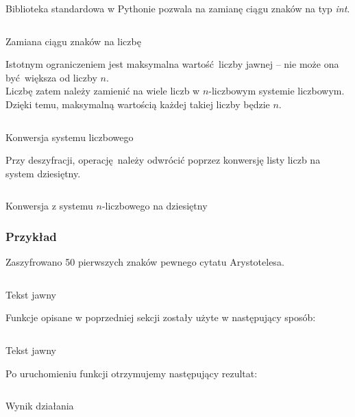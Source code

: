 \documentclass[12pt]{article}
\begin{document}
Biblioteka standardowa w Pythonie 
pozwala na zamianę ciągu znaków na typ \textit{int}.

\begin{listing}[H]
	\inputminted[]{python}{3-bytes-example.py}
	\caption{Zamiana ciągu znaków na liczbę}
\end{listing}

Istotnym ograniczeniem jest maksymalna wartość liczby jawnej -- nie może
ona być większa od liczby $n$.
\\

Liczbę zatem należy zamienić
na wiele liczb w $n$-liczbowym systemie liczbowym.
Dzięki temu, maksymalną wartością każdej takiej liczby będzie $n$.

\begin{listing}[H]
	\inputminted[firstline=7,lastline=17]{python}{../rsa.py}
	\caption{Konwersja systemu liczbowego}
\end{listing}

Przy deszyfracji, operację należy odwrócić poprzez konwersję listy
liczb na system dziesiętny.

\begin{listing}[H]
	\inputminted[firstline=19,lastline=26]{python}{../rsa.py}
	\caption{Konwersja z systemu $n$-liczbowego na dziesiętny}
\end{listing}

\subsubsection{Przykład}

Zaszyfrowano 50 pierwszych znaków pewnego cytatu Arystotelesa.

\begin{listing}[H]
	\inputminted[firstline=12,lastline=15]{python}{../aes_tests.py}
	\caption{Tekst jawny}
\end{listing}

Funkcje opisane w poprzedniej sekcji zostały użyte w następujący sposób:

\begin{listing}[H]
	\inputminted[firstline=54,lastline=59]{python}{../cli.py}
	\caption{Tekst jawny}
\end{listing}

Po uruchomieniu funkcji otrzymujemy następujący rezultat:

\begin{listing}[H]
	\inputminted{yaml}{3-rsa-enc-test.txt}
	\caption{Wynik działania}
\end{listing}
\end{document}

